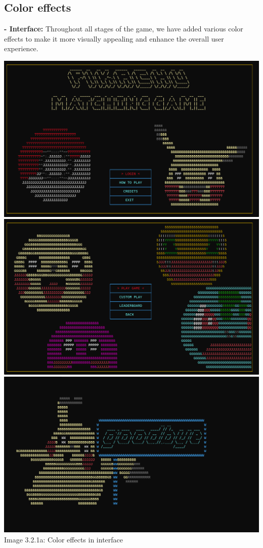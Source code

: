 \documentclass[12pt,a4paper]{report}
\begin{document}
\subsection{Color effects}
\textbf{- Interface:} Throughout all stages of the game, we have added various color effects to make it more visually appealing and enhance the overall user experience.
\begin{center}
    \includegraphics[scale=0.3]{Main Menu.png}\\[0.2cm]
    \includegraphics[scale=0.3]{Login Menu.png}\\[0.2cm]
    \includegraphics[scale=0.3]{Exit.png}\\[0.2cm]
    Image 3.2.1a: Color effects in interface
\end{center}
\end{document}
